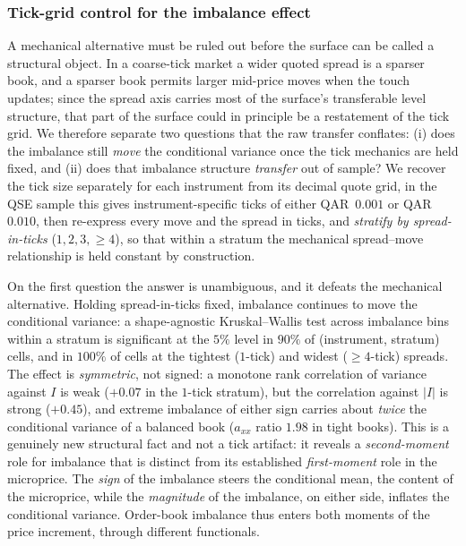 \documentclass[11pt]{article}
\theoremstyle{plain}
\theoremstyle{definition}
\newcommand{\axx}{a_{xx}}
\begin{document}
\subsubsection*{Tick-grid control for the imbalance effect}
\label{sub:res-tick}

A mechanical alternative must be ruled out before the surface can be called a structural
object. In a coarse-tick market a wider quoted spread is a sparser book, and a sparser book
permits larger mid-price moves when the touch updates; since the spread axis carries most of
the surface's transferable level structure, that part of the surface could in principle be a
restatement of the tick grid. We therefore separate two questions that the raw transfer
conflates: (i) does the imbalance still \emph{move} the conditional variance once the tick
mechanics are held fixed, and (ii) does that imbalance structure \emph{transfer} out of
sample? We recover the tick size separately for each instrument from its decimal quote
grid, in the QSE sample this gives instrument-specific ticks of either QAR~$0.001$ or
QAR~$0.010$, then re-express every move and the spread in ticks, and
\emph{stratify by spread-in-ticks}
($1,2,3,\ge 4$), so that within a stratum the mechanical spread--move relationship is held
constant by construction.

On the first question the answer is unambiguous, and it defeats the mechanical alternative.
Holding spread-in-ticks fixed, imbalance continues to move the conditional variance: a
shape-agnostic Kruskal--Wallis test across imbalance bins within a stratum is significant at
the $5\%$ level in $90\%$ of (instrument, stratum) cells, and in $100\%$ of cells at the
tightest ($1$-tick) and widest ($\ge 4$-tick) spreads. The effect is \emph{symmetric}, not
signed: a monotone rank correlation of variance against $I$ is weak ($+0.07$ in the $1$-tick
stratum), but the correlation against $\lvert I\rvert$ is strong ($+0.45$), and extreme
imbalance of either sign carries about \emph{twice} the conditional variance of a balanced
book ($\axx$ ratio $1.98$ in tight books). This is a genuinely new structural fact and not a
tick artifact: it reveals a \emph{second-moment} role for imbalance that is distinct from its
established \emph{first-moment} role in the microprice. The \emph{sign} of the imbalance steers
the conditional mean, the content of the microprice, while the \emph{magnitude} of the
imbalance, on either side, inflates the conditional variance. Order-book imbalance thus enters
both moments of the price increment, through different functionals.
\end{document}
